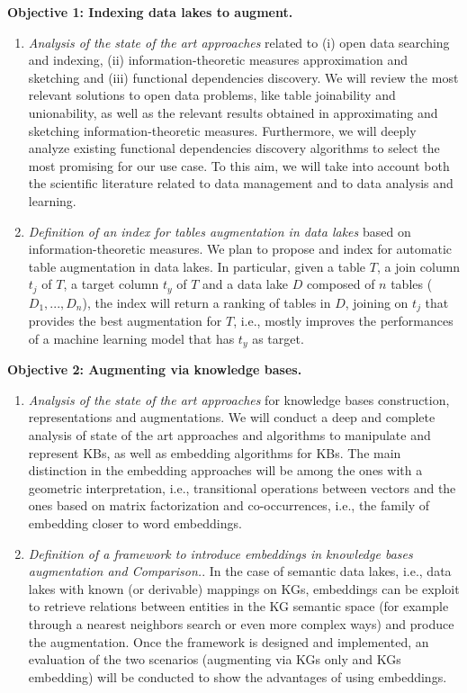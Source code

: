 \noindent\textbf{Objective 1: Indexing data lakes to augment.}
\begin{enumerate}
    \item \textit{Analysis of the state of the art approaches} related to (i) open data searching and indexing, (ii) information-theoretic measures approximation and sketching and (iii) functional dependencies discovery. We will review the most relevant solutions to open data problems, like table joinability and unionability, as well as the relevant results obtained in approximating and sketching information-theoretic measures. Furthermore, we will deeply analyze existing functional dependencies discovery algorithms to select the most promising for our use case. To this aim, we will take into account both the scientific literature related to data management and to data analysis and learning.
    \item \textit{Definition of an index for tables augmentation in data lakes} based on information-theoretic measures. We plan to propose and index for automatic table augmentation in data lakes. In particular, given a table $T$, a join column $t_j$ of $T$, a target column $t_y$ of $T$ and a data lake $D$ composed of $n$ tables ($D_1,...,D_n$), the index will return a ranking of tables in $D$, joining on $t_j$ that provides the best augmentation for $T$, i.e., mostly improves the performances of a machine learning model that has $t_y$ as target.
\end{enumerate}


\noindent\textbf{Objective 2: Augmenting via knowledge bases.}
\begin{enumerate}
    \item \textit{Analysis of the state of the art approaches} for knowledge bases construction, representations and augmentations. We will conduct a deep and complete analysis of state of the art approaches and algorithms to manipulate and represent KBs, as well as embedding algorithms for KBs. The main distinction in the embedding approaches will be among the ones with a geometric interpretation, i.e., transitional operations between vectors and the ones based on matrix factorization and co-occurrences, i.e., the family of embedding closer to word embeddings.
    \item \textit{Definition of a framework to introduce embeddings in knowledge bases augmentation and Comparison.}. In the case of semantic data lakes, i.e., data lakes with known (or derivable) mappings on KGs, embeddings can be exploit to retrieve relations between entities in the KG semantic space (for example through a nearest neighbors search or even more complex ways) and produce the augmentation. Once the framework is designed and implemented, an evaluation of the two scenarios (augmenting via KGs only and KGs embedding) will be conducted to show the advantages of using embeddings. 
\end{enumerate}

